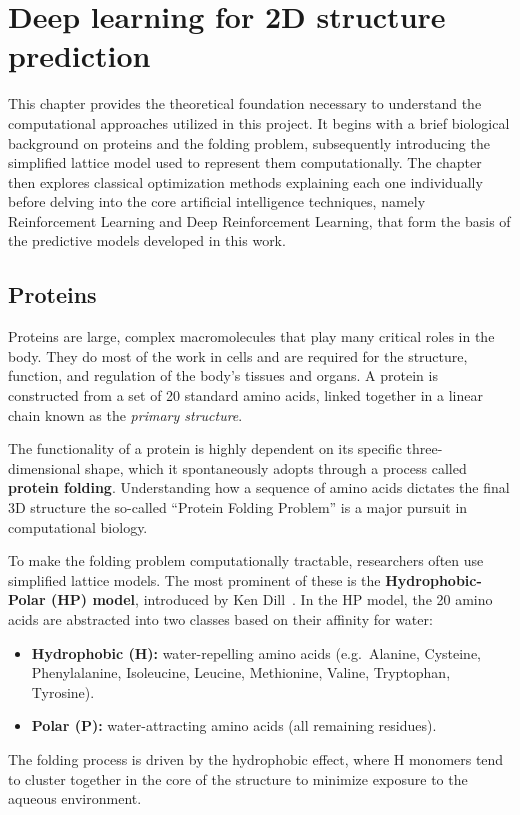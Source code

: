 \chapter{Deep learning for 2D structure prediction}
\label{cap2}

This chapter provides the theoretical foundation necessary to understand the computational approaches utilized in this project. It begins with a brief biological background on proteins and the folding problem, subsequently introducing the simplified lattice model used to represent them computationally. The chapter then explores classical optimization methods explaining each one individually before delving into the core artificial intelligence techniques, namely Reinforcement Learning and Deep Reinforcement Learning, that form the basis of the predictive models developed in this work.

\section{Proteins}
\label{cap2:sec_proteins}

Proteins are large, complex macromolecules that play many critical roles in the body. They do most of the work in cells and are required for the structure, function, and regulation of the body's tissues and organs. A protein is constructed from a set of 20 standard amino acids, linked together in a linear chain known as the \textit{primary structure}.

The functionality of a protein is highly dependent on its specific three-dimensional shape, which it spontaneously adopts through a process called \textbf{protein folding}. Understanding how a sequence of amino acids dictates the final 3D structure the so-called ``Protein Folding Problem'' is a major pursuit in computational biology.

To make the folding problem computationally tractable, researchers often use simplified lattice models. The most prominent of these is the \textbf{Hydrophobic-Polar (HP) model}, introduced by Ken Dill~\cite{dill1985theory}. In the HP model, the 20 amino acids are abstracted into two classes based on their affinity for water:
\begin{itemize}
    \item \textbf{Hydrophobic (H):} water-repelling amino acids (e.g.\ Alanine, Cysteine, Phenylalanine, Isoleucine, Leucine, Methionine, Valine, Tryptophan, Tyrosine).
    \item \textbf{Polar (P):} water-attracting amino acids (all remaining residues).
\end{itemize}
The folding process is driven by the hydrophobic effect, where H monomers tend to cluster together in the core of the structure to minimize exposure to the aqueous environment.

